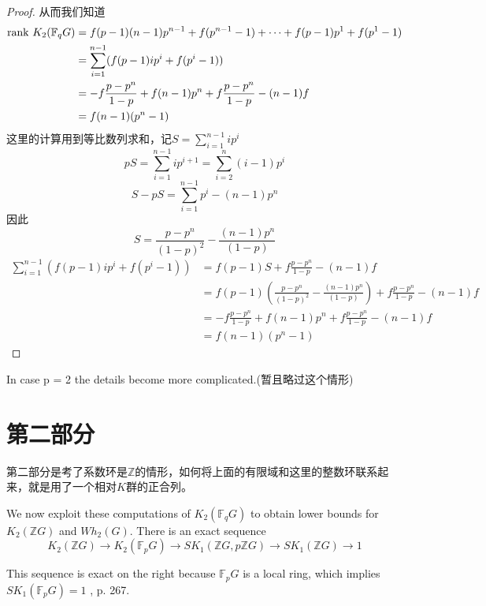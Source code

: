 \begin{proof}
从而我们知道
\begin{align*}
\mathrm{rank\ } K_2 (\mathbb{F}_q G) & = f(p-1)(n-1)p^{n-1}  +f(p^{n- 1}-1) + \cdots + f(p-1)p^{1}  +f(p^{1}-1) \\
& = \sum_{i=1}^{n-1}(f(p-1)ip^i  +f(p^i-1))\\
& = -f \frac{p-p^n}{1-p}+f(n-1)p^n +f \frac{p-p^n}{1-p} -(n-1)f\\
&= f(n-1)(p^n-1)
\end{align*}
这里的计算用到等比数列求和，记$S=\sum_{i=1}^{n-1}ip^i$
\[pS=\sum_{i=1}^{n-1}ip^{i+1}=\sum_{i=2}^{n}(i-1)p^{i}\]
\[S-pS=\sum_{i=1}^{n-1} p^i - (n-1)p^n\]
因此
\[S=\frac{p-p^n}{(1-p)^2}-\frac{(n-1)p^n}{(1-p)}\]
\begin{align*}
\sum_{i=1}^{n-1}(f(p-1)ip^i  +f(p^i-1)) &= f(p-1)S+f \frac{p-p^n}{1-p}-(n-1)f \\
& = f(p-1)(\frac{p-p^n}{(1-p)^2}-\frac{(n-1)p^n}{(1-p)})+f \frac{p-p^n}{1-p}-(n-1)f \\
& = -f \frac{p-p^n}{1-p}+f(n-1)p^n +f \frac{p-p^n}{1-p} -(n-1)f\\
&= f(n-1)(p^n-1)
\end{align*}

\end{proof}
In case p = 2 the details become more complicated.(暂且略过这个情形)







\section{第二部分} %
\label{sec:第二部分}
第二部分是考了系数环是$\mathbb{Z}$的情形，如何将上面的有限域和这里的整数环联系起来，就是用了一个相对$K$群的正合列。

We now exploit these computations of $K_2(\mathbb{F}_q G)$ to obtain lower bounds for $K_2(\mathbb{Z} G)$ and  $Wh_2(G)$.  There is an exact sequence
\begin{equation}
\label{exact:sk}
K_2(\mathbb{Z}G)\longrightarrow K_2(\mathbb{F}_p G)\longrightarrow SK_1(\mathbb{Z}G, p\mathbb{Z}G)\longrightarrow  SK_1(\mathbb{Z}G)\longrightarrow  1
\end{equation}

This sequence is exact on the right because $\mathbb{F}_p G$ is a local ring, which implies $SK_1(\mathbb{F}_p G)  = 1$ \cite{MR40:2736}, p. 267.

